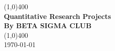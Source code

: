 \documentclass[11pt]{article}
\begin{document}
\begin{titlepage}
\begin{center}
\vspace*{1cm}
\vfill
\line(1,0){400}\\[1mm]
\huge{\textbf{Quantitative Research Projects}}\\[3mm]
\Large{\textbf{By BETA SIGMA CLUB}}\\[1mm]
\line(1,0){400}\\[3mm]
\vfill
\today

\end{center}
\end{titlepage}
\end{document}
